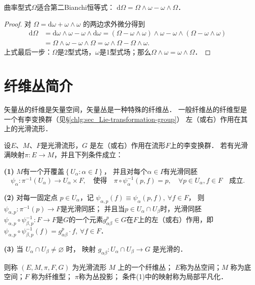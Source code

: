 \begin{theorem}\label{chfb:thm_2ndBianchi}
    曲率型式$\Omega$适合第二Bianchi恒等式：
    $ \mathrm{d} \Omega = \Omega \wedge \omega - \omega \wedge \Omega $．
\end{theorem}
\begin{proof}
对 $\Omega=\mathrm{d} \omega + \omega \wedge \omega$ 的两边求外微分得到
\begin{align*}
    \mathrm{d} \Omega & =\mathrm{d} \omega \wedge \omega- \omega \wedge \mathrm{d} \omega 
     =(\Omega-\omega \wedge \omega) \wedge \omega-\omega \wedge(\Omega-\omega \wedge \omega) \\
    & =\Omega \wedge \omega-\omega \wedge \Omega =\omega \wedge \Omega-\Omega \wedge \omega  .
\end{align*}
上式最后一步：$\Omega$是2型式场，$\omega$是1型式场；那么$\Omega \wedge \omega=\omega \wedge \Omega$．
\end{proof}





\section{纤维丛简介}\label{chfb:sec_fb}
矢量丛的纤维是矢量空间，矢量丛是一种特殊的纤维丛．
一般纤维丛的纤维型是一个有李变换群（见\S\ref{chlg:sec_Lie-transformation-group}）
左（或右）作用在其上的光滑流形．

\begin{definition}\label{chfb:def_fibre-bundles}
    设$E$、$ M$、$ F$是光滑流形，$G$ 是左（或右）作用在流形$F$上的李变换群．
    若有光滑满映射$\pi: E \rightarrow M$，并且下列条件成立：
    
    {\bfseries (1)} $M$有一个开覆盖$\left\{U_\alpha: \alpha \in I\right\}$，
    并且对每个$\alpha \in I$有光滑同胚
    \begin{equation*}
        \psi_\alpha: \pi^{-1}(U_\alpha) \to U_\alpha \times F,
        \quad \text{使得}\quad
        \pi \circ \psi_\alpha^{-1}(p, f)=p, \quad \forall p \in U_\alpha, f \in F 
        \quad \text{成立}.
    \end{equation*}
    
    {\bfseries (2)} 对每一固定点 $p \in U_\alpha$，记
    $\psi_{\alpha, p}(f)\equiv \psi_\alpha(p, f), \ \forall f \in F$，
    则 $\psi_{\alpha, p}: \pi^{-1}(p)\to F$是光滑同胚；
    并且当$p \in U_\alpha \cap U_\beta$时，光滑同胚$\psi_{\alpha, p}\circ \psi_{\beta, p}^{-1}:
    F \rightarrow F$是$G$的一个元素$g_{\alpha \beta}^p\in G$在$F$上的左（或右）作用，即
    $\psi_{\alpha, p} \circ \psi_{\beta, p}^{-1}(f)=g^p_{\alpha \beta} \cdot f, 
    \ \forall f \in F$．
    
    
    {\bfseries (3)} 当 $U_\alpha \cap U_\beta \neq \varnothing$ 时，
    映射 $g_{\alpha \beta}: U_\alpha \cap U_\beta \rightarrow G$ 是光滑的．
    
    则称 $(E, M, \pi, F, G)$ 为光滑流形 $M$ 上的一个{\heiti 纤维丛}；
    $E$称为{\heiti 丛空间}；$M$ 称为{\heiti 底空间}；$F$ 称为{\heiti 纤维型}；
    $\pi$称为{\heiti 丛投影}；
    条件(1)中的映射称为{\heiti 局部平凡化}．
\end{definition}

